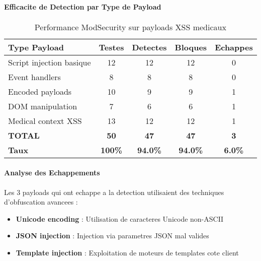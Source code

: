 \paragraph{Efficacite de Detection par Type de Payload}

\begin{table}[H]
    \centering
    \caption{Performance ModSecurity sur payloads XSS medicaux}
    \begin{tabular}{|l|c|c|c|c|}
        \hline
        \textbf{Type Payload}    & \textbf{Testes} & \textbf{Detectes} & \textbf{Bloques} & \textbf{Echappes} \\
        \hline
        Script injection basique & 12              & 12                & 12               & 0                 \\
        \hline
        Event handlers           & 8               & 8                 & 8                & 0                 \\
        \hline
        Encoded payloads         & 10              & 9                 & 9                & 1                 \\
        \hline
        DOM manipulation         & 7               & 6                 & 6                & 1                 \\
        \hline
        Medical context XSS      & 13              & 12                & 12               & 1                 \\
        \hline
        \textbf{TOTAL}           & \textbf{50}     & \textbf{47}       & \textbf{47}      & \textbf{3}        \\
        \hline
        \textbf{Taux}            & \textbf{100\%}  & \textbf{94.0\%}   & \textbf{94.0\%}  & \textbf{6.0\%}    \\
        \hline
    \end{tabular}
\end{table}

\paragraph{Analyse des Echappements}

Les 3 payloads qui ont echappe a la detection utilisaient des techniques d'obfuscation avancees :

\begin{itemize}
    \item \textbf{Unicode encoding} : Utilisation de caracteres Unicode non-ASCII
    \item \textbf{JSON injection} : Injection via parametres JSON mal valides
    \item \textbf{Template injection} : Exploitation de moteurs de templates cote client
\end{itemize}

